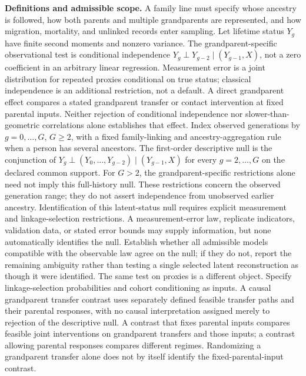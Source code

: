 \documentclass[11pt,a4paper]{article}
\begin{document}
\textbf{Definitions and admissible scope.} A family line must specify whose ancestry is followed, how both parents and multiple grandparents are represented, and how migration, mortality, and unlinked records enter sampling. Let lifetime status \(Y_g\) have finite second moments and nonzero variance. The grandparent-specific observational test is conditional independence \(Y_g\mathrel{\perp}Y_{g-2}\mid(Y_{g-1},X)\), not a zero coefficient in an arbitrary linear regression. Measurement error is a joint distribution for repeated proxies conditional on true status; classical independence is an additional restriction, not a default. A direct grandparent effect compares a stated grandparent transfer or contact intervention at fixed parental inputs. Neither rejection of conditional independence nor slower-than-geometric correlations alone establishes that effect. Index observed generations by \(g=0,\ldots,G\), \(G\ge2\), with a fixed family-linking and ancestry-aggregation rule when a person has several ancestors. The first-order descriptive null is the conjunction of \(Y_g\mathrel{\perp}(Y_0,\ldots,Y_{g-2})\mid(Y_{g-1},X)\) for every \(g=2,\ldots,G\) on the declared common support. For \(G>2\), the grandparent-specific restrictions alone need not imply this full-history null. These restrictions concern the observed generation range; they do not assert independence from unobserved earlier ancestry. Identification of this latent-status null requires explicit measurement and linkage-selection restrictions. A measurement-error law, replicate indicators, validation data, or stated error bounds may supply information, but none automatically identifies the null. Establish whether all admissible models compatible with the observable law agree on the null; if they do not, report the remaining ambiguity rather than testing a single selected latent reconstruction as though it were identified. The same test on proxies is a different object. Specify linkage-selection probabilities and cohort conditioning as inputs. A causal grandparent transfer contrast uses separately defined feasible transfer paths and their parental responses, with no causal interpretation assigned merely to rejection of the descriptive null. A contrast that fixes parental inputs compares feasible joint interventions on grandparent transfers and those inputs; a contrast allowing parental responses compares different regimes. Randomizing a grandparent transfer alone does not by itself identify the fixed-parental-input contrast.
\end{document}
